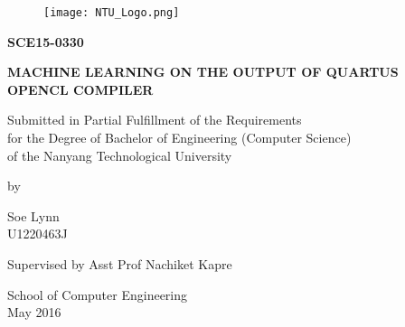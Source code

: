\thispagestyle{empty}

\begin{center}

\begin{figure}[h]
    \centering
    \texttt{[image: NTU\_Logo.png]}
\end{figure}

\vspace{2.0cm}

\textbf{\Large \MakeUppercase{SCE15-0330}} \\

\vspace{0.5cm}

\textbf{\Large \MakeUppercase{Machine Learning on the output of quartus OpenCL compiler}}

\vspace{3.0cm}

Submitted in Partial Fulfillment of the Requirements \\
for the Degree of Bachelor of Engineering (Computer Science) \\
of the Nanyang Technological University

\vspace{0.5cm}

by

\vspace{0.5cm}

Soe Lynn \\
U1220463J

\vspace{\fill}

Supervised by Asst Prof Nachiket Kapre

\vspace{\fill}

School of Computer Engineering \\
May 2016

\vspace{\fill}

\end{center}
